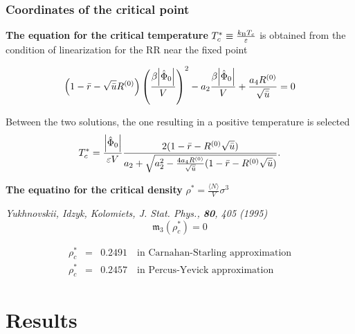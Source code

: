 \documentclass[8pt]{beamer}
\begin{document}
	\begin{frame}
		\frametitle{Coordinates of the critical point}
		
		\textbf{The equation for the critical temperature} $T_c^* \equiv \frac{k_{{\rm B}}T_c}{\varepsilon}$  is obtained from the condition of linearization for the RR near the fixed point
		
		\begin{equation*}
			\left(1 - \bar{r} - \sqrt{\bar{u}}R^{(0)}\right) \left(\frac{\beta\abs{\hat{\Phi}_0}}{V}\right)^2 - a_2\frac{\beta\abs{\hat{\Phi}_0}}{V} + \frac{a_4 R^{(0)}}{\sqrt{\bar{u}}} = 0
		\end{equation*}
		
		Between the two solutions, the one resulting in a positive temperature is selected
		\begin{equation*}
			\label{eq:T_c}
			T^*_c = \frac{\abs{\hat{\Phi}_0}}{\varepsilon V}
			\frac
			{2(1 - \bar{r} - R^{(0)}\sqrt{\bar{u}})}
			{a_2 + \sqrt{a_2^2 - \frac{4 a_4 R^{(0)}}{\sqrt{\bar{u}}} (1 - \bar{r} - R^{(0)}\sqrt{\bar{u}}) } }.
		\end{equation*}
		
		\textbf{The equatino for the critical density} $\rho^*=\frac{\langle N \rangle}{V}\sigma^3$ 
		
		\textit{Yukhnovskii, Idzyk, Kolomiets, J. Stat. Phys., \textbf{80}, 405 (1995)}
		\begin{equation*}
			\mathfrak{m}_3(\rho^*_c) = 0 
		\end{equation*}
		
		\begin{eqnarray*}
			\rho^*_c & = & 0.2491 \quad \text{in Carnahan-Starling approximation}
			\\
			\rho^*_c & = & 0.2457 \quad \text{in Percus-Yevick approximation}
		\end{eqnarray*}
	\end{frame}
	
	\section{Results}
	
\end{document}

